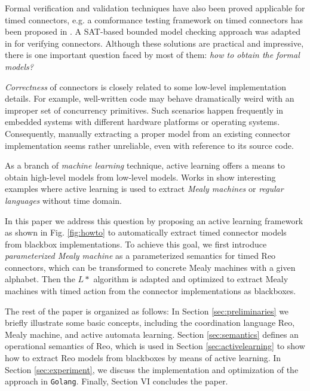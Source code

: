 \documentclass[conference, a4paper]{IEEEtran}
\begin{document}
Formal verification and validation techniques have also been proved applicable for timed connectors, 
e.g. a comformance testing framework on timed connectors has been proposed in \cite{DBLP:conf/tase/LiCWS15}.
A SAT-based bounded model checking approach was adapted in \cite{DBLP:journals/scp/Kemper12} for
verifying connectors. Although these solutions are practical and impressive, there is one important
question faced by most of them: \emph{how to obtain the formal models?}

\emph{Correctness} of connectors is closely related to some low-level implementation details.
For example, well-written code may behave dramatically weird with an improper set of concurrency
primitives. Such scenarios happen frequently in embedded systems with different hardware platforms or
operating systems. Consequently, manually extracting a proper model from an existing connector
implementation seems rather unreliable, even with reference to its source code.

As a branch of \emph{machine learning} technique, active learning offers a means to obtain
high-level models from low-level models. Works in \cite{de2010grammatical,
DBLP:journals/iandc/Angluin87, DBLP:conf/fase/RaffeltS06} show interesting examples where active
learning is used to extract \emph{Mealy machines} or \emph{regular languages} without time domain.


In this paper we address this question by proposing an active learning framework as shown in Fig.
\ref{fig:howto} to automatically extract timed connector models from blackbox implementations. 
To achieve this goal, we first introduce \emph{parameterized Mealy machine} as a parameterized
semantics for timed Reo connectors, which can be transformed to concrete Mealy machines with a
given alphabet. Then the $L*$ algorithm \cite{DBLP:journals/iandc/Angluin87} is adapted and
optimized to extract Mealy machines with timed action from the connector implementations as
blackboxes. 


The rest of the paper is organized as follows: In Section
\ref{sec:preliminaries} we briefly illustrate some basic concepts, including the coordination
language Reo, Mealy machine, and active automata learning. Section \ref{sec:semantics} defines an
operational semantics of Reo, which is used in Section \ref{sec:activelearning} to show how to
extract Reo models from blackboxes by means of active learning. In Section
\ref{sec:experiment}, we discuss the implementation and optimization of the approach in
\texttt{Golang}. Finally, Section VI concludes the paper.
\end{document}

